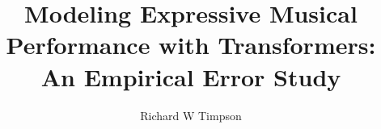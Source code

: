 \documentclass[doublespace,nopageskip]{VTthesis} %
\title{Modeling Expressive Musical Performance with Transformers: An Empirical Error Study}
\author{Richard W Timpson}
\begin{document}
  \frontmatter
  
  \maketitle
  \tableofcontents

	\listoffigures
	\listoftables

	\mainmatter

	\newcommand{\nep}{$N_{id}$}
	\newcommand{\mn}{$M$} %
	\newcommand{\nl}{$L$} %
	\newcommand{\dhid}{$d_{hid}$} %
	\newcommand{\drop}{$D$} %
	\newcommand{\lr}{$LR$} %
	\newcommand{\clip}{$C$} %
	\newcommand{\nh}{$H$} %

	\newcommand{\temp}{$t$}
	\newcommand{\vel}{$v$}
	\newcommand{\dev}{$d$}
	\newcommand{\art}{$a$}
	\newcommand{\ped}{$p$}

	\newcommand{\tm}[1]{$T_{N_{#1}}$}


	\listoftodos
	
	
	
	
	
	
	
	

	


	
      
    
\end{document}
